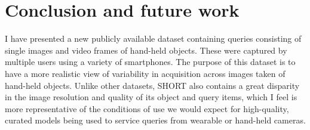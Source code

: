 


\section{Conclusion and future work} \label{sec:conclusions}

I have presented a new publicly available  dataset containing queries consisting of single images and video frames of hand-held objects.  These were captured by multiple users using a variety of smartphones. The purpose of this dataset is to have a more realistic view of variability in acquisition across images taken of hand-held objects. Unlike other datasets, SHORT also contains a great disparity in the image resolution and quality of its object and query items, which I feel is more representative of the conditions of use we would expect for high-quality, curated models being used to service queries from wearable or hand-held cameras.

